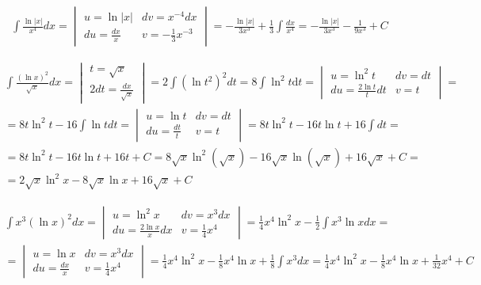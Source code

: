 \begin{gather*}
  \int \frac{\ln|x|}{x^4}dx
  = \begin{vmatrix}
    u=\ln|x| & dv=x^{-4}dx \\
    du=\frac{dx}{x} & v=-\frac{1}{3}x^{-3}
  \end{vmatrix}
  = -\frac{\ln|x|}{3x^3} + \frac{1}{3} \int \frac{dx}{x^4}
  = -\frac{\ln|x|}{3x^3} - \frac{1}{9x^3} +C
\end{gather*}


\begin{gather*}
  \int \frac{(\ln x)^2}{\sqrt{x}}dx =
  \begin{vmatrix}
    t=\sqrt{x} \\
    2dt=\frac{dx}{\sqrt{x}}
  \end{vmatrix}
  = 2 \int (\ln t^2)^2dt = 8\int \ln^2{t} \mbox{d}t =
  \begin{vmatrix}
    u=\ln^2t & dv=dt \\
    du=\frac{2\ln t}{t}dt & v=t
  \end{vmatrix} = \\
  = 8t\ln^2t - 16\int \ln t dt =
  \begin{vmatrix}
    u=\ln t & dv=dt \\
    du=\frac{dt}{t} & v=t
  \end{vmatrix}
  = 8t\ln^2t - 16t\ln t + 16\int dt = \\
  = 8t\ln^2t - 16t\ln t + 16t + C
  = 8\sqrt{x}\ln^2(\sqrt{x}) - 16\sqrt{x}\ln (\sqrt{x}) + 16\sqrt{x} +C = \\
  = 2\sqrt{x}\ln^2x - 8\sqrt{x}\ln x + 16\sqrt{x} + C
\end{gather*}



\begin{gather*}
  \int x^3(\ln x)^2dx =
  \begin{vmatrix}
    u=\ln^2x & dv=x^3dx \\
    du=\frac{2\ln x}{x}dx & v=\frac{1}{4}x^4
  \end{vmatrix}
  = \frac{1}{4}x^4\ln^2x - \frac{1}{2}\int x^3\ln x dx = \\
  = \begin{vmatrix}
    u=\ln x & dv=x^3dx \\
    du=\frac{dx}{x} & v=\frac{1}{4}x^4
  \end{vmatrix}
  = \frac{1}{4}x^4\ln^2x - \frac{1}{8}x^4\ln x + \frac{1}{8} \int x^3 dx
  = \frac{1}{4}x^4\ln^2x - \frac{1}{8}x^4\ln x + \frac{1}{32}x^4+C
\end{gather*}


